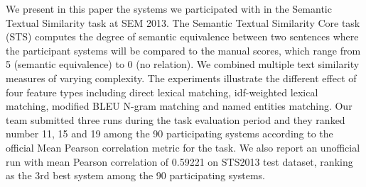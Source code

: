 We present in this paper the systems we participated with in the Semantic Textual Similarity task at SEM 2013. The Semantic Textual Similarity Core task 
 (STS) computes the degree of semantic equivalence between two sentences where
 the participant systems will be compared to the manual scores, which range from
 5 (semantic equivalence) to 0 (no relation). We combined multiple text
 similarity measures of varying complexity. The experiments illustrate the
 different effect of four feature types including direct lexical matching,
 idf-weighted lexical matching, modified BLEU N-gram matching and named entities
 matching. Our team submitted three runs during the task evaluation period and
 they ranked number 11, 15 and 19 among the 90 participating systems according
 to the official Mean Pearson correlation metric for the task. We also report an
 unofficial run with mean Pearson correlation of 0.59221 on STS2013 test
 dataset, ranking as the 3rd best system among the 90 participating systems.

